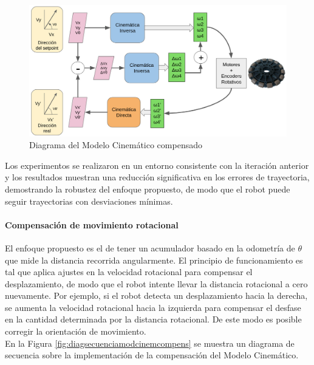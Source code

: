 \begin{figure}[htb]
    \centering
    \includegraphics[width=1\linewidth]{images/diag_compensacion_modelo_cinem.png}
    \caption{Diagrama del Modelo Cinemático compensado}
    \label{fig:diagramamodelocinemcompensado}
\end{figure}

Los experimentos se realizaron en un entorno consistente con la iteración anterior y los resultados muestran una reducción significativa en los errores de trayectoria, demostrando la robustez del enfoque propuesto, de modo que el robot puede seguir trayectorias con desviaciones mínimas.

\paragraph{Compensación de movimiento rotacional} \mbox{} \vspace{8pt}

El enfoque propuesto es el de tener un acumulador basado en la odometría de $\theta$ que mide la distancia recorrida angularmente. El principio de funcionamiento es tal que aplica ajustes en la velocidad rotacional para compensar el desplazamiento, de modo que el robot intente llevar la distancia rotacional a cero nuevamente. Por ejemplo, si el robot detecta un desplazamiento hacia la derecha, se aumenta la velocidad rotacional hacia la izquierda para compensar el desfase en la cantidad determinada por la distancia rotacional. De este modo es posible corregir la orientación de movimiento. \\

En la Figura \ref{fig:diagsecuenciamodcinemcompens} se muestra un diagrama de secuencia sobre la implementación de la compensación del Modelo Cinemático.

